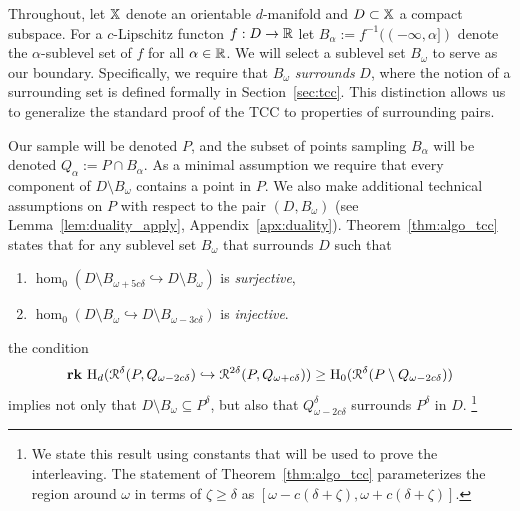 
Throughout, let $\mathbb{X}$ denote an orientable $d$-manifold and $D\subset\mathbb{X}$ a compact subspace.
For a $c$-Lipschitz functon $f : D\to \mathbb{R}$ let $B_\alpha := f^{-1}((-\infty,\alpha])$ denote the $\alpha$-sublevel set of $f$ for all $\alpha\in\mathbb{R}$.
We will select a sublevel set $B_\omega$ to serve as our boundary.
Specifically, we require that $B_\omega$ \emph{surrounds} $D$, where the notion of a surrounding set is defined formally in Section~\ref{sec:tcc}.
This distinction allows us to generalize the standard proof of the TCC to properties of surrounding pairs.

Our sample will be denoted $P$, and the subset of points sampling $B_\alpha$ will be denoted $Q_\alpha := P\cap B_\alpha$.
As a minimal assumption we require that every component of $D\setminus B_\omega$ contains a point in $P$.
We also make additional technical assumptions on $P$ with respect to the pair $(D, B_\omega)$ (see Lemma~\ref{lem:duality_apply}, Appendix~\ref{apx:duality}).
%
Theorem~\ref{thm:algo_tcc} states that for any sublevel set $B_\omega$ that surrounds $D$ such that
\begin{enumerate}
  \item $\hom_0(D\setminus B_{\omega+5c\delta}\hookrightarrow D\setminus B_\omega)$ is \emph{surjective},
  \item $\hom_0(D\setminus B_\omega\hookrightarrow D\setminus B_{\omega-3c\delta})$ is \emph{injective}.
\end{enumerate}
the condition
\[ \mathbf{rk}~\mathrm{H}_d(\mathcal{R}^\delta(P, Q_{\omega - 2c\delta})\hookrightarrow \mathcal{R}^{2\delta}(P, Q_{\omega+c\delta}))\geq \mathrm{H}_0(\mathcal{R}^\delta(P\setminus Q_{\omega-2c\delta})) \]
implies not only that $D\setminus B_\omega\subseteq P^\delta$, but also that $Q_{\omega-2c\delta}^\delta$ surrounds $P^\delta$ in $D$.
\footnote{We state this result using constants that will be used to prove the interleaving.
  The statement of Theorem~\ref{thm:algo_tcc} parameterizes the region around $\omega$ in terms of $\zeta\geq\delta$ as $[\omega-c(\delta+\zeta),\omega+c(\delta+\zeta)]$.}

